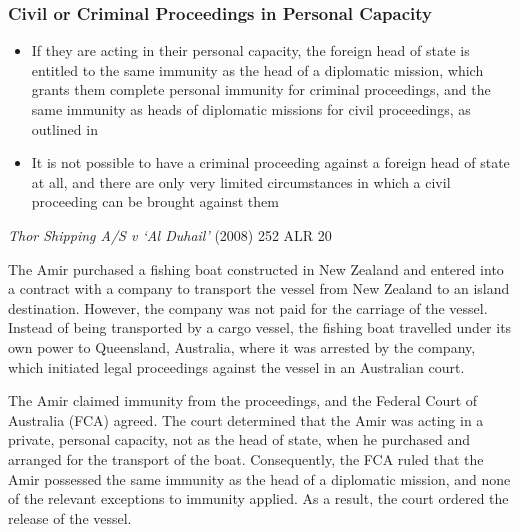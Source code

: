 \subsubsection{Civil or Criminal Proceedings in Personal Capacity}
\begin{itemize}
    \item If they are acting in their personal capacity, the foreign head of state is entitled to the same immunity as the head of a diplomatic mission, which grants them complete personal immunity for criminal proceedings, and the same immunity as heads of diplomatic missions for civil proceedings, as outlined in 
    \item It is not possible to have a criminal proceeding against a foreign head of state at all, and there are only very limited circumstances in which a civil proceeding can be brought against them
\end{itemize}

\begin{casedetails}{\textit{Thor Shipping A/S v `Al Duhail'} (2008) 252 ALR 20}
    \flushleft

    The Amir purchased a fishing boat constructed in New Zealand and entered into a contract with a company to transport the vessel from New Zealand to an island destination. However, the company was not paid for the carriage of the vessel. Instead of being transported by a cargo vessel, the fishing boat travelled under its own power to Queensland, Australia, where it was arrested by the company, which initiated legal proceedings against the vessel in an Australian court.

    \vspace{\baselineskip}

    The Amir claimed immunity from the proceedings, and the Federal Court of Australia (FCA) agreed. The court determined that the Amir was acting in a private, personal capacity, not as the head of state, when he purchased and arranged for the transport of the boat. Consequently, the FCA ruled that the Amir possessed the same immunity as the head of a diplomatic mission, and none of the relevant exceptions to immunity applied. As a result, the court ordered the release of the vessel.
\end{casedetails}

